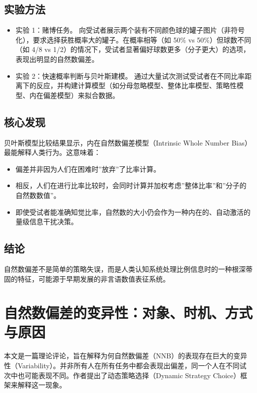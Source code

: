 \subsection{实验方法}

\begin{itemize}
    \item 实验 1：赌博任务。 向受试者展示两个装有不同颜色球的罐子图片（非符号化），要求选择获胜概率大的罐子。在概率相等（如 50\% vs 50\%）但球数不同（如 4/8 vs 1/2）的情况下，受试者显著偏好球数更多（分子更大）的选项，表现出明显的自然数偏差。
    \item 实验 2：快速概率判断与贝叶斯建模。 通过大量试次测试受试者在不同比率距离下的反应，并构建计算模型（如分母忽略模型、整体比率模型、策略性模型、内在偏差模型）来拟合数据。
\end{itemize}

\subsection{核心发现}

贝叶斯模型比较结果显示，内在自然数偏差模型（Intrinsic Whole Number Bias）最能解释人类行为。这意味着：
\begin{itemize}
    \item 偏差并非因为人们在困难时”放弃”了比率计算。
    \item 相反，人们在进行比率比较时，会同时计算并加权考虑”整体比率”和”分子的自然数数值”。
    \item 即使受试者能准确知觉比率，自然数的大小仍会作为一种内在的、自动激活的量级信息干扰决策。
\end{itemize}

\subsection{结论}

自然数偏差不是简单的策略失误，而是人类认知系统处理比例信息时的一种根深蒂固的特征，可能源于早期发展的非言语数值表征系统。

\section{自然数偏差的变异性：对象、时机、方式与原因}

本文是一篇理论评论，旨在解释为何自然数偏差（NNB）的表现存在巨大的变异性（Variability）。并非所有人在所有任务中都会表现出偏差，同一个人在不同试次中也可能表现不同。作者提出了动态策略选择（Dynamic Strategy Choice）框架来解释这一现象。


